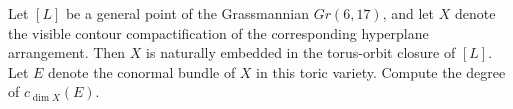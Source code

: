 Let $[L]$ be a general point of the Grassmannian $Gr(6, 17)$, and let $X$ denote the visible contour compactification of the corresponding hyperplane arrangement. Then $X$ is naturally embedded in the torus-orbit closure of $[L]$. Let $E$ denote the conormal bundle of $X$ in this toric variety. Compute the degree of $c_{\dim X}(E)$.

